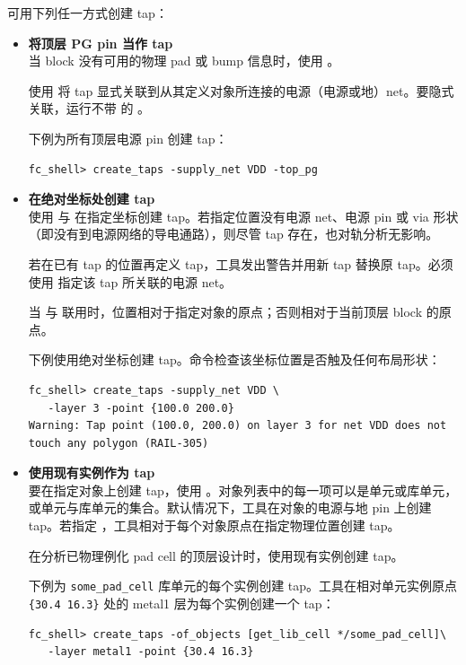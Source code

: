 可用下列任一方式创建 tap：

\begin{itemize}
  \item \textbf{将顶层 PG pin 当作 tap}\\
    当 block 没有可用的物理 pad 或 bump 信息时，使用 。

    使用  将 tap 显式关联到从其定义对象所连接的电源（电源或地）net。要隐式关联，运行不带  的 。

    下例为所有顶层电源 pin 创建 tap：
\begin{lstlisting}
fc_shell> create_taps -supply_net VDD -top_pg
\end{lstlisting}

  \item \textbf{在绝对坐标处创建 tap}\\
    使用  与  在指定坐标创建 tap。若指定位置没有电源 net、电源 pin 或 via 形状（即没有到电源网络的导电通路），则尽管 tap 存在，也对轨分析无影响。

    若在已有 tap 的位置再定义 tap，工具发出警告并用新 tap 替换原 tap。必须使用  指定该 tap 所关联的电源 net。

\begin{noteBox}
当  与  联用时，位置相对于指定对象的原点；否则相对于当前顶层 block 的原点。
\end{noteBox}

    下例使用绝对坐标创建 tap。命令检查该坐标位置是否触及任何布局形状：
\begin{lstlisting}
fc_shell> create_taps -supply_net VDD \
   -layer 3 -point {100.0 200.0}
Warning: Tap point (100.0, 200.0) on layer 3 for net VDD does not
touch any polygon (RAIL-305)
\end{lstlisting}

  \item \textbf{使用现有实例作为 tap}\\
    要在指定对象上创建 tap，使用  。对象列表中的每一项可以是单元或库单元，或单元与库单元的集合。默认情况下，工具在对象的电源与地 pin 上创建 tap。若指定 ，工具相对于每个对象原点在指定物理位置创建 tap。

    在分析已物理例化 pad cell 的顶层设计时，使用现有实例创建 tap。

    下例为 \texttt{some\_pad\_cell} 库单元的每个实例创建 tap。工具在相对单元实例原点 \texttt{\{30.4 16.3\}} 处的 metal1 层为每个实例创建一个 tap：
\begin{lstlisting}
fc_shell> create_taps -of_objects [get_lib_cell */some_pad_cell]\
   -layer metal1 -point {30.4 16.3}
\end{lstlisting}


\end{itemize}
